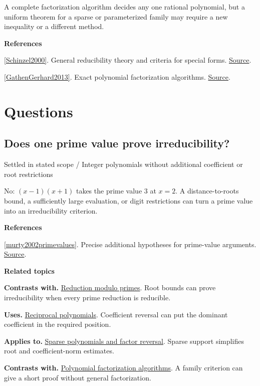 \documentclass[11pt,a4paper,oneside,openany]{book}
\newenvironment{sources}{\par\smallskip\begingroup\footnotesize\color{atlasgray}\leftskip=10pt\setlength{\parskip}{2pt}}{\par\endgroup\smallskip}
\begin{document}
\color{black} A complete factorization algorithm decides any one rational polynomial, but a uniform theorem for a sparse or parameterized family may require a new inequality or a different method.\par
\begin{sources}
\textbf{References}\par\smallskip
\noindent\hyperlink{ref:Schinzel2000}{[Schinzel2000]}. General reducibility theory and criteria for special forms. \href{https://doi.org/10.1017/CBO9780511542916}{Source}.\par
\noindent\hyperlink{ref:GathenGerhard2013}{[GathenGerhard2013]}. Exact polynomial factorization algorithms. \href{https://doi.org/10.1017/CBO9781139856065}{Source}.\par
\end{sources}\color{black}
\section*{Questions}
\subsection*{Does one prime value prove irreducibility?}
{\small\sffamily\color{atlasgold}Settled in stated scope / Integer polynomials without additional coefficient or root restrictions}\par\smallskip
\color{black} No: \((x-1)(x+1)\) takes the prime value \(3\) at \(x=2\). A distance-to-roots bound, a sufficiently large evaluation, or digit restrictions can turn a prime value into an irreducibility criterion.\par
\begin{sources}
\textbf{References}\par\smallskip
\noindent\hyperlink{ref:murty2002primevalues}{[murty2002primevalues]}. Precise additional hypotheses for prime-value arguments. \href{https://doi.org/10.1080/00029890.2002.11919872}{Source}.\par
\end{sources}\color{black}
\par\medskip\begingroup\footnotesize\setlength{\parskip}{1pt}\textbf{\sffamily\color{atlasgreen}Related topics}\par
\color{black}\textbf{Contrasts with.} \hyperlink{article:modular-irreducibility}{Reduction modulo primes}. Root bounds can prove irreducibility when every prime reduction is reducible.\par
\color{black}\textbf{Uses.} \hyperlink{article:reciprocity}{Reciprocal polynomials}. Coefficient reversal can put the dominant coefficient in the required position.\par
\color{black}\textbf{Applies to.} \hyperlink{article:sparse-gaps}{Sparse polynomials and factor reversal}. Sparse support simplifies root and coefficient-norm estimates.\par
\color{black}\textbf{Contrasts with.} \hyperlink{article:factorization-algorithms}{Polynomial factorization algorithms}. A family criterion can give a short proof without general factorization.\par
\endgroup
\end{document}
